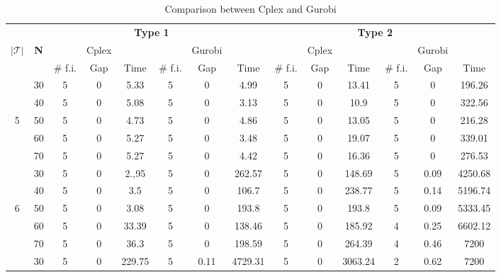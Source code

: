 \documentclass{itor}
\theoremstyle{definition}
\theoremstyle{remark}
\begin{document}
\begin{table}[htbp]
  \centering
  \tiny
  \caption{Comparison between Cplex and Gurobi}
    \begin{tabular}{|c|c|cccccc|cccccc|}
    \toprule
          &       &       &       & \multicolumn{2}{c}{\textbf{Type 1}} &       &       &       &       & \multicolumn{2}{c}{\textbf{Type 2}} &       &  \\
    $|\mathcal T|$   & \textbf{N}     &       & Cplex &       &       & Gurobi &       &       & Cplex &       &       & Gurobi &  \\
          &       & \# f.i. & Gap   & Time  & \# f.i. & Gap   & Time  & \# f.i. & Gap   & Time  & \# f.i. & Gap   & Time \\
    \midrule
          & 30    & 5     & 0     & 5.33  & 5     & 0     & 4.99  & 5     & 0     & 13.41 & 5     & 0     & 196.26 \\
          & 40    & 5     & 0     & 5.08  & 5     & 0     & 3.13  & 5     & 0     & 10.9  & 5     & 0     & 322.56 \\
    5     & 50    & 5     & 0     & 4.73  & 5     & 0     & 4.86  & 5     & 0     & 13.05 & 5     & 0     & 216.28 \\
          & 60    & 5     & 0     & 5.27  & 5     & 0     & 3.48  & 5     & 0     & 19.07 & 5     & 0     & 339.01 \\
          & 70    & 5     & 0     & 5.27  & 5     & 0     & 4.42  & 5     & 0     & 16.36 & 5     & 0     & 276.53 \\
    \midrule
          & 30    & 5     & 0     & 2.,95 & 5     & 0     & 262.57 & 5     & 0     & 148.69 & 5     & 0.09  & 4250.68 \\
          & 40    & 5     & 0     & 3.5   & 5     & 0     & 106.7 & 5     & 0     & 238.77 & 5     & 0.14  & 5196.74 \\
    6     & 50    & 5     & 0     & 3.08  & 5     & 0     & 193.8 & 5     & 0     & 193.8 & 5     & 0.09  & 5333.45 \\
          & 60    & 5     & 0     & 33.39 & 5     & 0     & 138.46 & 5     & 0     & 185.92 & 4     & 0.25  & 6602.12 \\
          & 70    & 5     & 0     & 36.3  & 5     & 0     & 198.59 & 5     & 0     & 264.39 & 4     & 0.46  & 7200 \\
    \midrule
          & 30    & 5     & 0     & 229.75 & 5     & 0.11  & 4729.31 & 5     & 0     & 3063.24 & 2     & 0.62  & 7200 \\

\end{tabular}
\end{table}
\end{document}
